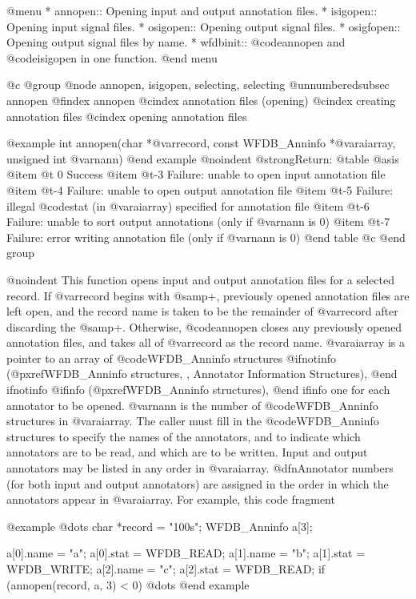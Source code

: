 {{{{{{{{@menu
* annopen::		Opening input and output annotation files.
* isigopen::		Opening input signal files.
* osigopen::		Opening output signal files.
* osigfopen::		Opening output signal files by name.
* wfdbinit::		@code{annopen} and @code{isigopen} in one function.
@end menu

@c @group
@node     annopen, isigopen, selecting, selecting
@unnumberedsubsec annopen
@findex annopen
@cindex annotation files (opening)
@cindex creating annotation files
@cindex opening annotation files

@example
int annopen(char *@var{record}, const WFDB_Anninfo *@var{aiarray},
            unsigned int @var{nann})
@end example
@noindent
@strong{Return:}
@table @asis
@item @t{ 0}
Success
@item @t{-3}
Failure: unable to open input annotation file
@item @t{-4}
Failure: unable to open output annotation file
@item @t{-5}
Failure: illegal @code{stat} (in @var{aiarray}) specified for annotation file
@item @t{-6}
Failure: unable to sort output annotations (only if @var{nann} is 0)
@item @t{-7}
Failure: error writing annotation file (only if @var{nann} is 0)
@end table
@c @end group

@noindent
This function opens input and output annotation files for a selected
record.  If @var{record} begins with @samp{+}, previously opened
annotation files are left open, and the record name is taken to be the
remainder of @var{record} after discarding the @samp{+}.  Otherwise,
@code{annopen} closes any previously opened annotation files, and takes
all of @var{record} as the record name.  @var{aiarray} is a pointer to
an array of @code{WFDB_Anninfo} structures
@ifnotinfo
(@pxref{WFDB_Anninfo structures, , Annotator Information Structures}),
@end ifnotinfo
@ifinfo
(@pxref{WFDB_Anninfo structures}),
@end ifinfo
one for each annotator to be opened.  @var{nann} is the number of
@code{WFDB_Anninfo} structures in @var{aiarray}.  The caller must
fill in the @code{WFDB_Anninfo} structures to specify the names of the
annotators, and to indicate which annotators are to be read, and which
are to be written.  Input and output annotators may be listed in any
order in @var{aiarray}.  @dfn{Annotator numbers} (for both input and
output annotators) are assigned in the order in which the annotators
appear in @var{aiarray}.  For example, this code fragment

@example
@dots{}
char *record = "100s";
WFDB_Anninfo a[3];

a[0].name = "a"; a[0].stat = WFDB_READ;
a[1].name = "b"; a[1].stat = WFDB_WRITE;
a[2].name = "c"; a[2].stat = WFDB_READ;
if (annopen(record, a, 3) < 0)
@dots{}
@end example

}}}}}}}}
